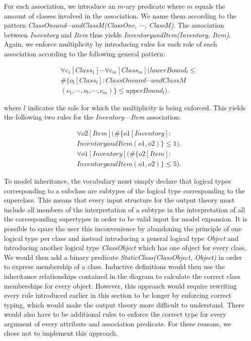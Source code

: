 \documentclass[conference]{IEEEtran}
\begin{document}
For each association, we introduce an $m$-ary predicate where $m$ equals the amount of classes involved in the association. We name them according to the pattern \textit{ClassOneand$\cdots$andClassM(ClassOne, $\cdots$, ClassM)}. The association between \textit{Inventory} and \textit{Item} thus yields \textit{InventoryandItem(Inventory, Item)}. Again, we enforce multiplicity by introducing rules for each role of each association according to the following general pattern:

\begin{align*}
	&\forall{c_1}[Class_1]\cdots{}\forall{c_m}[Class_m](lowerBound_l \leq \\ &\#\{o_l[Class_l] : ClassOneand\cdots{}andClassM\\&(c_1, \cdots, o_l, \cdots, c_m)\} \leq upperBound_l).
\end{align*}

where $l$ indicates the role for which the multiplicity is being enforced. This yields the following two rules for the \textit{Inventory}---\textit{Item} association:

\begin{align*}
	&\forall{o2}[Item](\#\{o1[Inventory] : \\ &InventoryandItem(o1, o2)\} \leq 1). \\
	&\forall{o1}[Inventory](\#\{o2[Item] : \\ &InventoryandItem(o1, o2)\} \leq 5).
\end{align*}

To model inheritance, the vocabulary must simply declare that logical types corresponding to a subclass are subtypes of the logical type corresponding to the superclass. This means that every input structure for the output theory must include all members of the interpretation of a subtype in the interpretation of all the corresponding supertypes in order to be valid input for model expansion. It is possible to spare the user this inconvenience by abandoning the principle of one logical type per class and instead introducing a general logical type \textit{Object} and introducing another logical type \textit{ClassObject} which has one object for every class. We would then add a binary predicate \textit{StaticClass(ClassObject, Object)} in order to express membership of a class. Inductive definitions would then use the inheritance relationships contained in the diagram to calculate the correct class memberships for every object. However, this approach would require rewriting every rule introduced earlier in this section to be longer by enforcing correct typing, which would make the output theory more difficult to understand. There would also have to be additional rules to enforce the correct type for every argument of every attribute and association predicate. For these reasons, we chose not to implement this approach.
\end{document}
